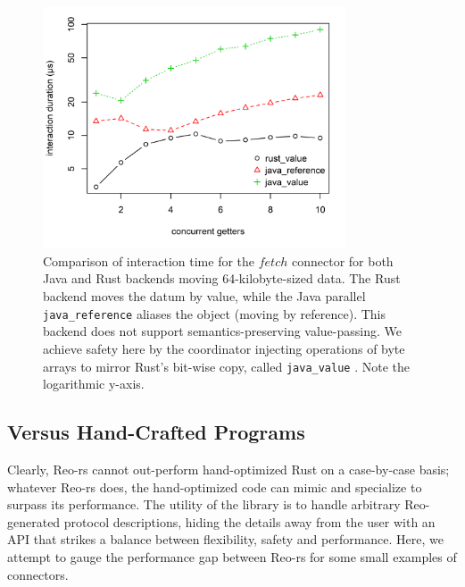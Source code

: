 \begin{figure}
	\centering
	\includegraphics[width=0.80\textwidth]{experiments/rust_v_java_2.png}
	\caption[Java vs.\ Rust interaction time for large values.]{Comparison of interaction time for the $fetch$ connector for both Java and Rust backends moving 64-kilobyte-sized data. The Rust backend moves the datum by value, while the Java parallel \texttt{java\_reference}  aliases the object (moving by reference). This backend does not support semantics-preserving value-passing. We achieve safety here by the coordinator injecting  operations of byte arrays to mirror Rust's bit-wise copy, called \texttt{java\_value} . Note the logarithmic y-axis.}
	\label{fig:rust_v_java_2}
\end{figure}

\subsection{Versus Hand-Crafted Programs}

Clearly, Reo-rs cannot out-perform hand-optimized Rust on a case-by-case basis; whatever Reo-rs does, the hand-optimized code can mimic and specialize to surpass its performance. The utility of the library is to handle arbitrary Reo-generated protocol descriptions, hiding the details away from the user with an API that strikes a balance between flexibility, safety and performance. Here, we attempt to gauge the performance gap between Reo-rs for some small examples of connectors.


